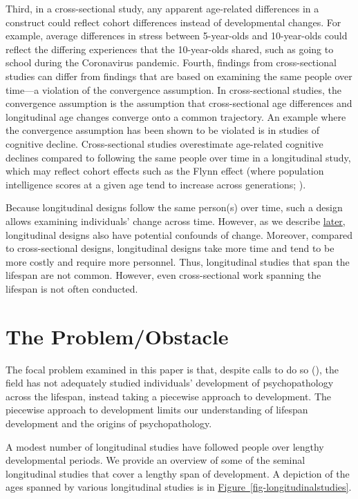 \documentclass[
  american,
  letterpaper,
  12pt]{article}
\begin{document}
Third, in a cross-sectional study, any apparent age-related differences
in a construct could reflect cohort differences instead of developmental
changes. For example, average differences in stress between 5-year-olds
and 10-year-olds could reflect the differing experiences that the
10-year-olds shared, such as going to school during the Coronavirus
pandemic. Fourth, findings from cross-sectional studies can differ from
findings that are based on examining the same people over time---a
violation of the convergence assumption. In cross-sectional studies, the
convergence assumption is the assumption that cross-sectional age
differences and longitudinal age changes converge onto a common
trajectory. An example where the convergence assumption has been shown
to be violated is in studies of cognitive decline. Cross-sectional
studies overestimate age-related cognitive declines compared to
following the same people over time in a longitudinal study, which may
reflect cohort effects such as the Flynn effect (where population
intelligence scores at a given age tend to increase across generations;
).

Because longitudinal designs follow the same person(s) over time, such a
design allows examining individuals' change across time. However, as we
describe \hyperref[sec-potential-confounds-of-change]{later},
longitudinal designs also have potential confounds of change. Moreover,
compared to cross-sectional designs, longitudinal designs take more time
and tend to be more costly and require more personnel. Thus,
longitudinal studies that span the lifespan are not common. However,
even cross-sectional work spanning the lifespan is not often conducted.

\section{The Problem/Obstacle}\label{the-problemobstacle}

The focal problem examined in this paper is that, despite calls to do so
(), the field has not
adequately studied individuals' development of psychopathology across
the lifespan, instead taking a piecewise approach to development. The
piecewise approach to development limits our understanding of lifespan
development and the origins of psychopathology.

A modest number of longitudinal studies have followed people over
lengthy developmental periods. We provide an overview of some of the
seminal longitudinal studies that cover a lengthy span of development. A
depiction of the ages spanned by various longitudinal studies is in
\hyperref[fig-longitudinalstudies]{Figure~\ref*{fig-longitudinalstudies}}.
\end{document}
